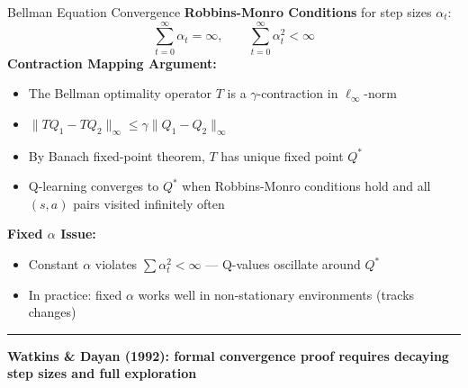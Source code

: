 \documentclass[8pt,aspectratio=169]{beamer}
\newcommand{\bottomnote}[1]{%
\vfill
\vspace{-2mm}
\textcolor{mllavender2}{\rule{\textwidth}{0.4pt}}
\vspace{1mm}
\footnotesize
\textbf{#1}
}
\begin{document}
\begin{frame}[t]{Bellman Equation Convergence}
\textbf{Robbins-Monro Conditions} for step sizes $\alpha_t$:
\[
\sum_{t=0}^{\infty} \alpha_t = \infty, \qquad \sum_{t=0}^{\infty} \alpha_t^2 < \infty
\]
\vspace{0.3em}
\textbf{Contraction Mapping Argument:}
\begin{itemize}
\item The Bellman optimality operator $T$ is a $\gamma$-contraction in $\ell_\infty$-norm
\item $\|TQ_1 - TQ_2\|_\infty \leq \gamma \|Q_1 - Q_2\|_\infty$
\item By Banach fixed-point theorem, $T$ has unique fixed point $Q^*$
\item Q-learning converges to $Q^*$ when Robbins-Monro conditions hold and all $(s,a)$ pairs visited infinitely often
\end{itemize}
\vspace{0.3em}
\textbf{Fixed $\alpha$ Issue:}
\begin{itemize}
\item Constant $\alpha$ violates $\sum \alpha_t^2 < \infty$ --- Q-values oscillate around $Q^*$
\item In practice: fixed $\alpha$ works well in non-stationary environments (tracks changes)
\end{itemize}
\bottomnote{Watkins \& Dayan (1992): formal convergence proof requires decaying step sizes and full exploration}
\end{frame}
\end{document}
